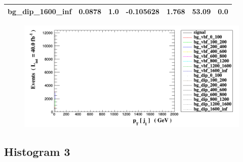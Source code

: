 \documentclass[a4paper, 10pt]{article}
\begin{document}
\begin{table}[H]
\begin{center}
\begin{tabular}{|m{23.0mm}|m{23.0mm}|m{18.0mm}|m{19.0mm}|m{19.0mm}|m{19.0mm}|m{19.0mm}|}
      \hline
      {\cellcolor{white}         bg\_dip\_1600\_inf}& {\cellcolor{white}         0.0878}& {\cellcolor{white}         1.0}& {\cellcolor{white}         -0.105628}& {\cellcolor{white}         1.768}& {\cellcolor{red}         53.09}& {\cellcolor{red}         0.0}\\
\hline
    \end{tabular}
  \end{center}
\end{table}

\begin{figure}[H]
  \begin{center}
    \includegraphics[scale=0.45]{selection_1.png}\\
\caption{   }
  \end{center}
\end{figure}
      \newpage
\subsection{ Histogram 3}
\end{document}
